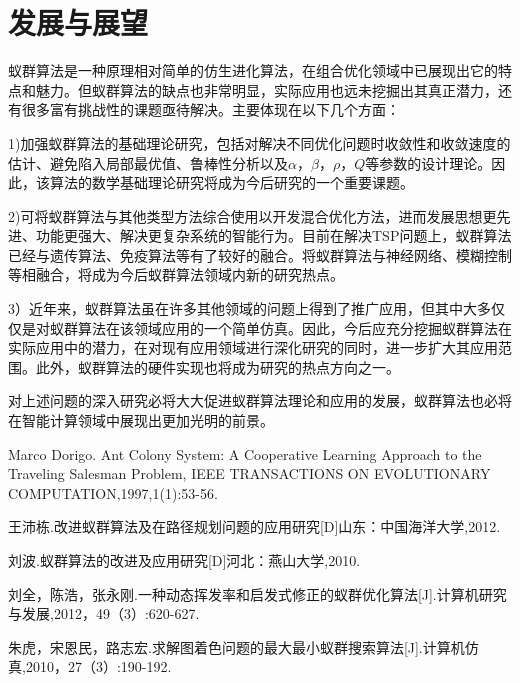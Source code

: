 \documentclass[a4paper,12pt]{report}
\begin{document}
\chapter{发展与展望}

\pagestyle{fancy}

	蚁群算法是一种原理相对简单的仿生进化算法，在组合优化领域中已展现出它的特点和魅力。但蚁群算法的缺点也非常明显，实际应用也远未挖掘出其真正潜力，还有很多富有挑战性的课题亟待解决。主要体现在以下几个方面：

	1)加强蚁群算法的基础理论研究，包括对解决不同优化问题时收敛性和收敛速度的估计、避免陷入局部最优值、鲁棒性分析以及$\alpha$，$\beta$，$\rho$，$Q$等参数的设计理论。因此，该算法的数学基础理论研究将成为今后研究的一个重要课题。
	
	2)可将蚁群算法与其他类型方法综合使用以开发混合优化方法，进而发展思想更先进、功能更强大、解决更复杂系统的智能行为。目前在解决TSP问题上，蚁群算法已经与遗传算法、免疫算法等有了较好的融合。将蚁群算法与神经网络、模糊控制等相融合，将成为今后蚁群算法领域内新的研究热点。

	3）近年来，蚁群算法虽在许多其他领域的问题上得到了推广应用，但其中大多仅仅是对蚁群算法在该领域应用的一个简单仿真。因此，今后应充分挖掘蚁群算法在实际应用中的潜力，在对现有应用领域进行深化研究的同时，进一步扩大其应用范围。此外，蚁群算法的硬件实现也将成为研究的热点方向之一。

	对上述问题的深入研究必将大大促进蚁群算法理论和应用的发展，蚁群算法也必将在智能计算领域中展现出更加光明的前景。




\begin{thebibliography}{99}
\songti {} 	


\pagestyle{fancy}

	Marco Dorigo. Ant Colony System: A Cooperative Learning Approach to the Traveling Salesman Problem, IEEE TRANSACTIONS ON EVOLUTIONARY COMPUTATION,1997,1(1):53-56.
	
	王沛栋.改进蚁群算法及在路径规划问题的应用研究[D]山东：中国海洋大学,2012.

	刘波.蚁群算法的改进及应用研究[D]河北：燕山大学,2010.

	刘全，陈浩，张永刚.一种动态挥发率和启发式修正的蚁群优化算法[J].计算机研究与发展,2012，49（3）:620-627.

	朱虎，宋恩民，路志宏.求解图着色问题的最大最小蚁群搜索算法[J].计算机仿真,2010，27（3）:190-192.

	
\end{thebibliography}

	
\end{document}
